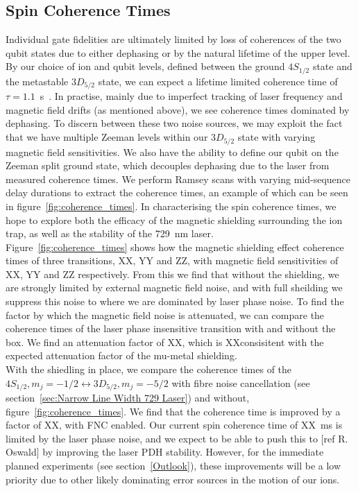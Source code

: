 \documentclass[12pt]{report}
\begin{document}
\subsection{Spin Coherence Times}
\label{sec:Coherence}
    Individual gate fidelities are ultimately limited by loss of coherences of
    the two qubit states due to either dephasing or by the natural lifetime of the upper level. By our choice of ion and qubit levels, defined between
    the ground $4S_{1/2}$ state and the metastable $3D_{5/2}$ state, we can
    expect a lifetime limited coherence time of $\tau = 1.1$~s~\cite{}. 
    In practise, mainly due to imperfect tracking of laser frequency and
    magnetic field drifts (as mentioned above), we see coherence times dominated
    by dephasing. To discern between these two noise sources, we may exploit the
    fact that we have multiple Zeeman levels within our $3D_{5/2}$ state with
    varying magnetic field sensitivities. We also have the ability to define our
    qubit on the Zeeman split ground state, which decouples dephasing due to the
    laser from measured coherence times. We perform Ramsey scans with varying
    mid-sequence delay durations to extract the coherence times, an example of
    which can be seen in figure~\ref{fig:coherence_times}. In characterising the
    spin coherence times, we hope to explore both the efficacy of the magnetic
    shielding surrounding the ion trap, as well as the stability of the 729~nm
    laser. \\
    Figure~\ref{fig:coherence_times} shows how the magnetic shielding effect
    coherence times of three transitions, XX, YY and ZZ, with magnetic field
    sensitivities of XX, YY and ZZ respectively.  From this we find that without
    the shielding, we are strongly limited by external magnetic field noise, and
    with full sheilding we suppress this noise to where we are dominated by
    laser phase noise. To find the factor by which the magnetic field noise is
    attenuated, we can compare the coherence times of the laser phase
    insensitive transition with and without the box. We find an attenuation
    factor of XX, which is XXconsisitent with the expected attenuation factor of
    the mu-metal shielding.\\
    With the shiedling in place, we compare the coherence times of the
    $4S_{1/2}, m_j = -1/2 \leftrightarrow 3D_{5/2}, m_j = -5/2$ with fibre noise cancellation (see
    section~\ref{sec:Narrow Line Width 729 Laser}) and without, figure~\ref{fig:coherence_times}. We find that the
    coherence time is improved by a factor of XX, with FNC enabled. Our current
    spin coherence time of XX~ms is limited by the laser phase noise, and we
    expect to be able to push this to [ref R. Oswald] by improving the laser PDH
    stability. However, for the immediate planned experiments (see
    section~\ref{Outlook}), these improvements will be a low priority due to
    other likely dominating error sources in the motion of our ions.\\
\end{document}
